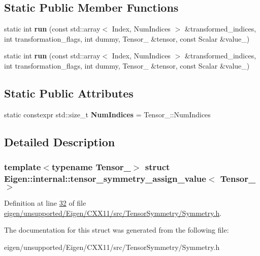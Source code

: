 \subsection*{Static Public Member Functions}
\begin{DoxyCompactItemize}
\item 
\mbox{\label{struct_eigen_1_1internal_1_1tensor__symmetry__assign__value_aa2bb4442f357a0e0366a2458622a2dbb}} 
static int {\bfseries run} (const std\+::array$<$ Index, Num\+Indices $>$ \&transformed\+\_\+indices, int transformation\+\_\+flags, int dummy, Tensor\+\_\+ \&tensor, const Scalar \&value\+\_\+)
\item 
\mbox{\label{struct_eigen_1_1internal_1_1tensor__symmetry__assign__value_aa2bb4442f357a0e0366a2458622a2dbb}} 
static int {\bfseries run} (const std\+::array$<$ Index, Num\+Indices $>$ \&transformed\+\_\+indices, int transformation\+\_\+flags, int dummy, Tensor\+\_\+ \&tensor, const Scalar \&value\+\_\+)
\end{DoxyCompactItemize}
\subsection*{Static Public Attributes}
\begin{DoxyCompactItemize}
\item 
\mbox{\label{struct_eigen_1_1internal_1_1tensor__symmetry__assign__value_ab8eb04de902383f5cc2e18162fc992d4}} 
static constexpr std\+::size\+\_\+t {\bfseries Num\+Indices} = Tensor\+\_\+\+::\+Num\+Indices
\end{DoxyCompactItemize}


\subsection{Detailed Description}
\subsubsection*{template$<$typename Tensor\+\_\+$>$\newline
struct Eigen\+::internal\+::tensor\+\_\+symmetry\+\_\+assign\+\_\+value$<$ Tensor\+\_\+ $>$}



Definition at line \hyperlink{eigen_2unsupported_2_eigen_2_c_x_x11_2src_2_tensor_symmetry_2_symmetry_8h_source_l00032}{32} of file \hyperlink{eigen_2unsupported_2_eigen_2_c_x_x11_2src_2_tensor_symmetry_2_symmetry_8h_source}{eigen/unsupported/\+Eigen/\+C\+X\+X11/src/\+Tensor\+Symmetry/\+Symmetry.\+h}.



The documentation for this struct was generated from the following file\+:\begin{DoxyCompactItemize}
\item 
eigen/unsupported/\+Eigen/\+C\+X\+X11/src/\+Tensor\+Symmetry/\+Symmetry.\+h\end{DoxyCompactItemize}
